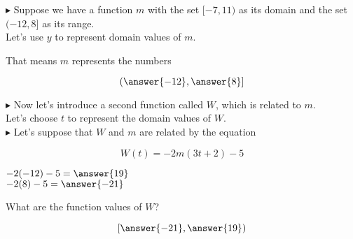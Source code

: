 \documentclass{ximera}
\begin{document}
\begin{example}




\textbf{\textcolor{blue!55!black}{$\blacktriangleright$}}  Suppose we have a function $m$ with the set $[-7, 11)$ as its domain and the set $(-12, 8]$ as its range. \\

Let's use $y$ to represent domain values of $m$.  



\begin{question}

That means $m$ represents the numbers 

\[
\left( \answer{-12}, \answer{8} \right]
\]

\end{question}






\textbf{\textcolor{blue!55!black}{$\blacktriangleright$}} Now let's introduce a second function called $W$, which is related to $m$. \\

Let's choose $t$ to represent the domain values of $W$. \\


\textbf{\textcolor{blue!55!black}{$\blacktriangleright$}} Let's suppose that $W$ and $m$ are related by the equation 

\[ 
W(t) = -2 m(3t + 2) - 5
\]





\begin{question}

$-2 (-12) - 5 = \answer{19}$ \\

$-2 (8) - 5 = \answer{-21}$ \\

\end{question}






\begin{question}

What are the function values of $W$?


\[
\left[ \answer{-21}, \answer{19} \right)
\]


\end{question}


\end{example}
\end{document}

